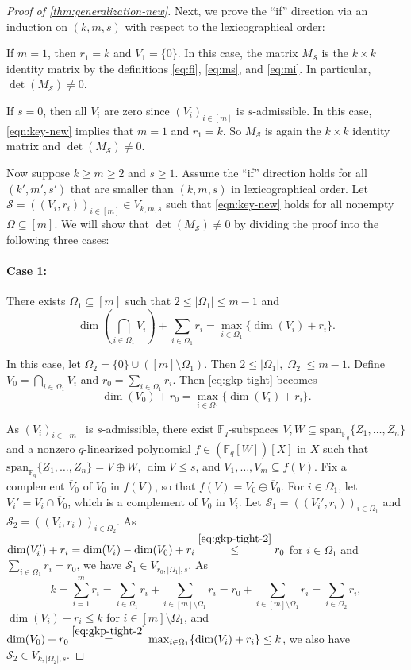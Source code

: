\documentclass[11pt]{article}
\theoremstyle{plain}
\theoremstyle{definition}
\theoremstyle{remark}
\newcommand{\F}{\mathbb{F}}
\newcommand{\cS}{\mathcal{S}}
\begin{document}
\begin{proof}[Proof of \cref{thm:generalization-new}]
Next, we prove the ``if'' direction via an induction on $(k,m,s)$ with respect to the lexicographical order:

If $m=1$, then $r_1=k$ and $V_1=\{0\}$. In this case, the matrix $M_{\cS}$ is the $k\times k$ identity matrix by the definitions \eqref{eq:fi}, \eqref{eq:ms}, and \eqref{eq:mi}. In particular, $\det(M_{\cS})\neq 0$.

If $s=0$, then all $V_i$ are zero since $(V_i)_{i\in [m]}$ is $s$-admissible.
In this case, \eqref{eqn:key-new} implies that $m=1$ and $r_1=k$. So $M_{\cS}$ is again the $k\times k$ identity matrix and $\det(M_{\cS})\neq 0$.

Now suppose $k\geq m\geq 2$ and $s\geq 1$.
Assume the ``if'' direction holds for all $(k',m',s')$ that are smaller than $(k,m,s)$ in lexicographical order. 
Let $\cS=((V_i,r_i))_{i\in [m]}\in V_{k,m,s}$ such that \eqref{eqn:key-new} holds for all nonempty $\Omega\subseteq [m]$.
We will show that $\det(M_{\cS})\neq 0$ by dividing the proof into the following three cases:

\paragraph{Case 1:} There exists $\Omega_1\subseteq [m]$ such that $2\leq |\Omega_1|\leq m-1$ and 
\begin{equation}\label{eq:gkp-tight}
\dim\left(\bigcap_{i\in \Omega_1}V_i\right)+\sum_{i\in \Omega_1}r_i=\max_{i\in \Omega_1}\{\dim(V_i)+r_i\}.
\end{equation}

In this case, let $\Omega_2=\{0\}\cup ([m]\setminus\Omega_1)$. Then $2\leq |\Omega_1|,|\Omega_2|\leq m-1$. 
Define $V_0=\bigcap_{i\in \Omega_1}V_i$ and $r_0=\sum_{i\in \Omega_1}r_i$. 
Then \eqref{eq:gkp-tight} becomes 
\begin{equation}\label{eq:gkp-tight-2}
\dim(V_0)+r_0=\max_{i\in \Omega_1}\{\dim(V_i)+r_i\}.
\end{equation}

As $(V_i)_{i\in [m]}$ is $s$-admissible, there exist $\F_q$-subspaces $V,W\subseteq \mathrm{span}_{\F_q}\{Z_1,\dots,Z_{n}\}$ and a nonzero $q$-linearized polynomial $f\in (\F_q[W])[X]$ in $X$ such that $\mathrm{span}_{\F_q}\{Z_1,\dots,Z_{n}\}=V\oplus W$, $\dim V\leq s$, and
$V_1,\dots,V_m\subseteq f(V)$.
Fix a complement $\overline{V}_0$ of $V_0$ in $f(V)$, so that $f(V)=V_0\oplus \overline{V}_0$.
For $i\in \Omega_1$, let $V_i'=V_i\cap \overline{V}_0$, which is a complement of $V_0$ in $V_i$. 
Let $\cS_1=((V_i', r_i))_{i\in \Omega_1}$ and $\cS_2=((V_i, r_i))_{i\in \Omega_2}$.
As $\dim(V'_i)+r_i=\dim(V_i)-\dim(V_0)+r_i\stackrel{\eqref{eq:gkp-tight-2}}{\leq} r_0$ for $i\in\Omega_1$ and $\sum_{i\in \Omega_1} r_i=r_0$, we have $\cS_1\in V_{r_0,|\Omega_1|,s}$.
As
\[
k=\sum_{i=1}^m r_i=\sum_{i\in \Omega_1}r_i+\sum_{i\in [m]\setminus\Omega_1}r_i=r_0+\sum_{i\in [m]\setminus\Omega_1}r_i=\sum_{i\in\Omega_2}r_i,
\]
$\dim(V_i)+r_i\leq k$ for $i\in [m]\setminus\Omega_1$, and $\dim(V_0)+r_0\stackrel{\eqref{eq:gkp-tight-2}}{=}\max_{i\in \Omega_1}\{\dim(V_i)+r_i\}\leq k$, we also have $\cS_2\in V_{k,|\Omega_2|,s}$.


\end{proof}
\end{document}
